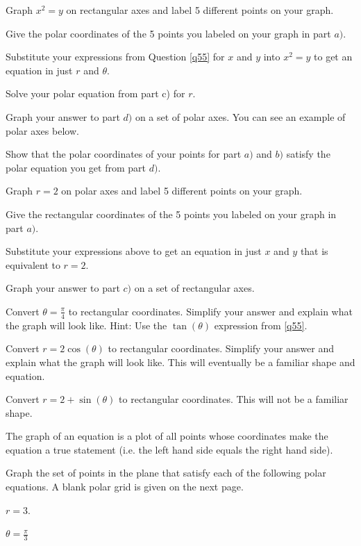 \bq
\be
\item Graph $x^2=y$ on rectangular axes and label 5 different points on your graph.
\item Give the polar coordinates of the 5 points you labeled on your graph in part $a)$.
\item Substitute your expressions from Question \ref{q55} for $x$ and $y$ into $x^2=y$ to get an equation in just $r$ and $\theta$.
\item Solve your polar equation from part c) for $r$.
\item Graph your answer to part $d)$ on a set of polar axes. You can see an example of polar axes below.
\item Show that the polar coordinates of your points for part $a)$ and $b)$ satisfy the polar equation you get from part $d)$.
\ee
\eq

\bq \be
\item Graph $r=2$ on polar axes and label 5 different points on your graph.
\item Give the rectangular coordinates of the 5 points you labeled on your graph in part $a)$.
\item Substitute your expressions above to get an equation in just $x$ and $y$ that is equivalent to $r=2$.
\item Graph your answer to part $c)$ on a set of rectangular axes.
\ee
\eq

\bq Convert $\theta=\frac{\pi}{4}$ to rectangular coordinates. Simplify your answer and explain what the graph will look like. Hint: Use the $\tan(\theta)$ expression from \ref{q55}.
\eq

\bq Convert $r=2 \cos(\theta)$ to rectangular coordinates. Simplify your answer and explain what the graph will look like. This will eventually be a familiar shape and equation.
\eq

\bq Convert $r=2+\sin(\theta)$ to rectangular coordinates. This will not be a familiar shape.
\eq

\begin{info} The graph of an equation is a plot of all points whose coordinates make the equation a true statement (i.e. the left hand side equals the right hand side).

\end{info}

\bq Graph the set of points in the plane that satisfy each of the following polar equations.
A blank polar grid  is given on the next page. \be
\item $r=3$.
\item $\theta=\frac{\pi}{3}$
\ee \eq

